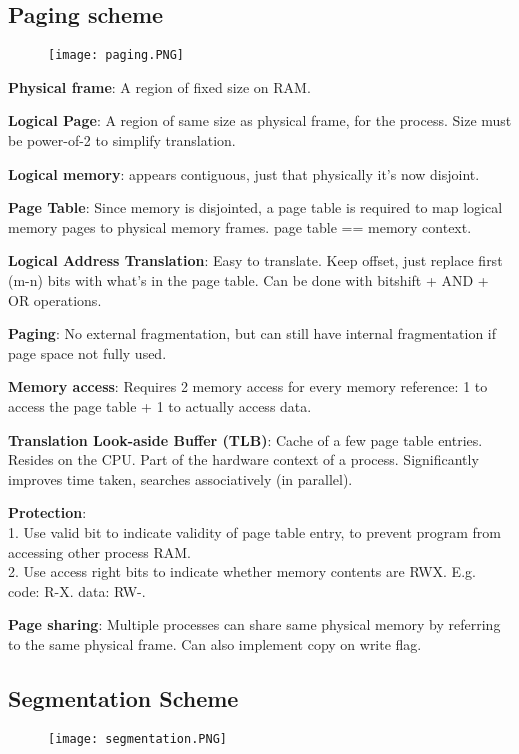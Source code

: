 \documentclass[a4paper,landscape]{article}
\newcommand{\rnsubtopic}[1]{\vspace{-1.5em}\subsection*{#1}\vspace{-1.0em}}
\newcommand{\rnname}[1]{\textbf{#1}}
\begin{document}
\begin{multicols*}{4}
\begin{flatitemize}
\rnsubtopic{Paging scheme}
\vspace{-1.5em}
\begin{figure}[H]
  \texttt{[image: paging.PNG]}
\end{figure}
\vspace{-1.5em}
\item \rnname{Physical frame}: A region of fixed size on RAM.
\item \rnname{Logical Page}: A region of same size as physical frame, for the process. Size must be power-of-2 to simplify translation.
\item \rnname{Logical memory}: appears contiguous, just that physically it's now disjoint.
\item \rnname{Page Table}: Since memory is disjointed, a page table is required to map logical memory pages to physical memory frames. page table == memory context.
\item \rnname{Logical Address Translation}: Easy to translate. Keep offset, just replace first (m-n) bits with what's in the page table. Can be done with bitshift + AND + OR operations.
\item \rnname{Paging}: No external fragmentation, but can still have internal fragmentation if page space not fully used.
\item \rnname{Memory access}: Requires 2 memory access for every memory reference: 1 to access the page table + 1 to actually access data.
\item \rnname{Translation Look-aside Buffer (TLB)}: Cache of a few page table entries. Resides on the CPU. Part of the hardware context of a process. Significantly improves time taken, searches associatively (in parallel).
\item \rnname{Protection}: \\
1. Use valid bit to indicate validity of page table entry, to prevent program from accessing other process RAM.\\
2. Use access right bits to indicate whether memory contents are RWX. E.g. code: R-X. data: RW-.
\item \rnname{Page sharing}: Multiple processes can share same physical memory by referring to the same physical frame. Can also implement copy on write flag.
\rnsubtopic{Segmentation Scheme}
\vspace{-1.5em}
\begin{figure}[H]
  \texttt{[image: segmentation.PNG]}
\end{figure}
\vspace{-1.5em}

\end{flatitemize}
\end{multicols*}
\end{document}
